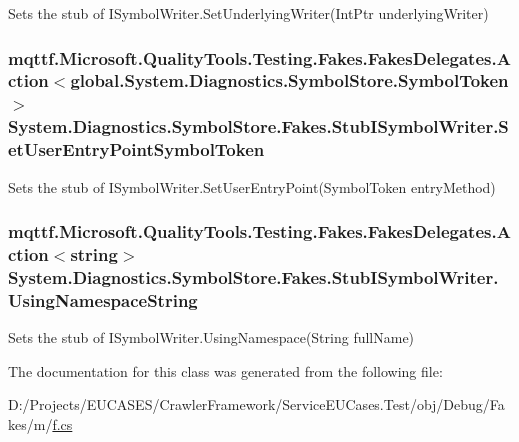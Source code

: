 Sets the stub of I\-Symbol\-Writer.\-Set\-Underlying\-Writer(\-Int\-Ptr underlying\-Writer)

\hypertarget{class_system_1_1_diagnostics_1_1_symbol_store_1_1_fakes_1_1_stub_i_symbol_writer_aed04a2d310776cd5094f86c3586b3f4b}{
\subsubsection[{Set\-User\-Entry\-Point\-Symbol\-Token}]{\setlength{\rightskip}{0pt plus 5cm}mqttf.\-Microsoft.\-Quality\-Tools.\-Testing.\-Fakes.\-Fakes\-Delegates.\-Action$<$global.\-System.\-Diagnostics.\-Symbol\-Store.\-Symbol\-Token$>$ System.\-Diagnostics.\-Symbol\-Store.\-Fakes.\-Stub\-I\-Symbol\-Writer.\-Set\-User\-Entry\-Point\-Symbol\-Token}}\label{class_system_1_1_diagnostics_1_1_symbol_store_1_1_fakes_1_1_stub_i_symbol_writer_aed04a2d310776cd5094f86c3586b3f4b}


Sets the stub of I\-Symbol\-Writer.\-Set\-User\-Entry\-Point(\-Symbol\-Token entry\-Method)

\hypertarget{class_system_1_1_diagnostics_1_1_symbol_store_1_1_fakes_1_1_stub_i_symbol_writer_af95fb17ae1449e0cb68ddeb5b34a355b}{
\subsubsection[{Using\-Namespace\-String}]{\setlength{\rightskip}{0pt plus 5cm}mqttf.\-Microsoft.\-Quality\-Tools.\-Testing.\-Fakes.\-Fakes\-Delegates.\-Action$<$string$>$ System.\-Diagnostics.\-Symbol\-Store.\-Fakes.\-Stub\-I\-Symbol\-Writer.\-Using\-Namespace\-String}}\label{class_system_1_1_diagnostics_1_1_symbol_store_1_1_fakes_1_1_stub_i_symbol_writer_af95fb17ae1449e0cb68ddeb5b34a355b}


Sets the stub of I\-Symbol\-Writer.\-Using\-Namespace(\-String full\-Name)



The documentation for this class was generated from the following file\-:\begin{DoxyCompactItemize}
\item 
D\-:/\-Projects/\-E\-U\-C\-A\-S\-E\-S/\-Crawler\-Framework/\-Service\-E\-U\-Cases.\-Test/obj/\-Debug/\-Fakes/m/\hyperlink{m_2f_8cs}{f.\-cs}\end{DoxyCompactItemize}
